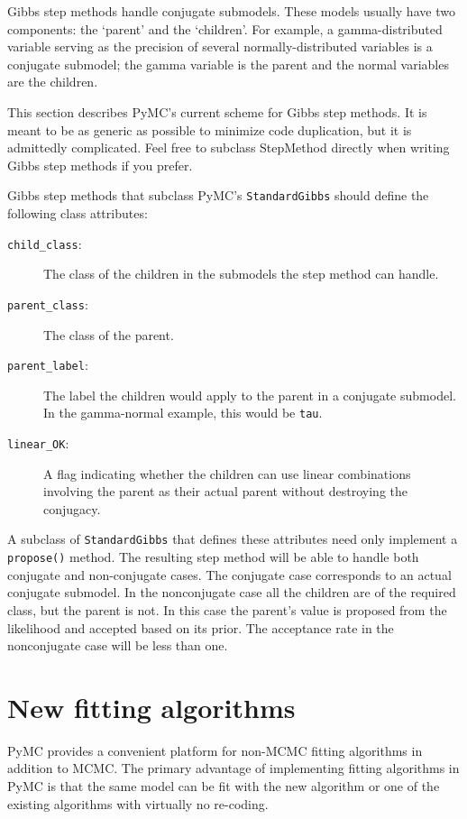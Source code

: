 Gibbs step methods handle conjugate submodels. These models usually have two components: the `parent' and the `children'. For example, a gamma-distributed variable serving as the precision of several normally-distributed variables is a conjugate submodel; the gamma variable is the parent and the normal variables are the children. 

This section describes PyMC's current scheme for Gibbs step methods. It is meant to be as generic as possible to minimize code duplication, but it is admittedly complicated. Feel free to subclass StepMethod directly when writing Gibbs step methods if you prefer.

Gibbs step methods that subclass PyMC's \texttt{StandardGibbs} should define the following class attributes:
\begin{description}
   \item[\texttt{child_class}:] The class of the children in the submodels the step method can handle.
   \item[\texttt{parent_class}:] The class of the parent.
   \item[\texttt{parent_label}:] The label the children would apply to the parent in a conjugate submodel. In the gamma-normal example, this would be \texttt{tau}.
   \item[\texttt{linear_OK}:] A flag indicating whether the children can use linear combinations involving the parent as their actual parent without destroying the conjugacy.
\end{description}

A subclass of \texttt{StandardGibbs} that defines these attributes need only implement a \texttt{propose()} method. The resulting step method will be able to handle both conjugate and non-conjugate cases. The conjugate case corresponds to an actual conjugate submodel. In the nonconjugate case all the children are of the required class, but the parent is not. In this case the parent's value is proposed from the likelihood and accepted based on its prior. The acceptance rate in the nonconjugate case will be less than one.

\hypertarget{custom-model}{}
\section*{New fitting algorithms} \label{custom-model}

PyMC provides a convenient platform for non-MCMC fitting algorithms in addition to MCMC. The primary advantage of implementing fitting algorithms in PyMC is that the same model can be fit with the new algorithm or one of the existing algorithms with virtually no re-coding.


